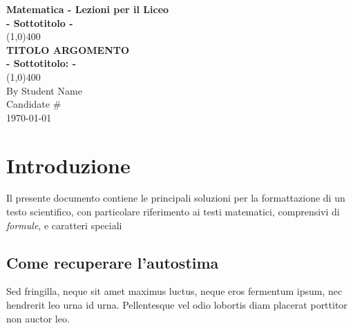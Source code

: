 \documentclass[11pt]{article}
\begin{document}
\begin{titlepage}
\begin{center}
\vspace*{1cm}

\Large{\textbf{Matematica - Lezioni per il Liceo}}\\
\large{\textbf{- Sottotitolo -}}\\
\vfill
\line(1,0){400}\\[.5mm]
\huge{\textbf{TITOLO ARGOMENTO}}\\[3mm]
\Large{\textbf{- Sottotitolo:  -}}\\[1mm]
\line(1,0){400}\\
\vfill
{\scriptsize By Student Name}\\
{\scriptsize Candidate \#} \\
{\scriptsize \today} \\

\end{center}
\end{titlepage}


\tableofcontents
\thispagestyle{empty}
\clearpage

\setcounter{page}{1}

\vspace*{1cm}
\section{Introduzione}
Il presente documento contiene le principali soluzioni per la formattazione di un testo scientifico, con particolare riferimento ai testi matematici, comprensivi di \emph{formule}, e caratteri speciali

\subsection{Come recuperare l'autostima}
Sed fringilla, neque sit amet maximus luctus, neque eros fermentum ipsum, nec hendrerit leo urna id urna. Pellentesque vel odio lobortis diam placerat porttitor non auctor leo.\\
\end{document}
